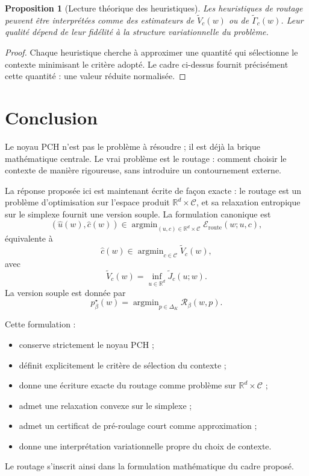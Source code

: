 \documentclass[11pt,a4paper]{article}
\newtheorem{proposition}{Proposition}[section]
\DeclareMathOperator{\argmin}{argmin}
\newcommand{\R}{\mathbb R}
\newcommand{\Ccal}{\mathcal C}
\newcommand{\Rcal}{\mathcal R}
\begin{document}
\begin{proposition}[Lecture théorique des heuristiques]
Les heuristiques de routage peuvent être interprétées comme des estimateurs de \(\widetilde V_c(w)\) ou de \(\widetilde \Gamma_c(w)\). Leur qualité dépend de leur fidélité à la structure variationnelle du problème.
\end{proposition}

\begin{proof}
Chaque heuristique cherche à approximer une quantité qui sélectionne le contexte minimisant le critère adopté. Le cadre ci-dessus fournit précisément cette quantité : une valeur réduite normalisée.
\end{proof}

\section{Conclusion}

Le noyau PCH n'est pas le problème à résoudre ; il est déjà la brique mathématique centrale. Le vrai problème est le routage : comment choisir le contexte de manière rigoureuse, sans introduire un contournement externe.

La réponse proposée ici est maintenant écrite de façon exacte : le routage est un problème d'optimisation sur l'espace produit \(\R^d\times\Ccal\), et sa relaxation entropique sur le simplexe fournit une version souple. La formulation canonique est
\[
(\hat u(w),\hat c(w))\in\argmin_{(u,c)\in\R^d\times\Ccal}\mathcal E_{\mathrm{route}}(w;u,c),
\]
équivalente à
\[
\hat c(w)\in\argmin_{c\in\Ccal}\widetilde V_c(w),
\]
avec
\[
\widetilde V_c(w)=\inf_{u\in\R^d}\widetilde J_c(u;w).
\]
La version souple est donnée par
\[
p^\star_\beta(w)
=
\argmin_{p\in\Delta_K}\Rcal_\beta(w,p).
\]

Cette formulation :
\begin{itemize}[leftmargin=2em]
\item conserve strictement le noyau PCH ;
\item définit explicitement le critère de sélection du contexte ;
\item donne une écriture exacte du routage comme problème sur \(\R^d\times\Ccal\) ;
\item admet une relaxation convexe sur le simplexe ;
\item admet un certificat de pré-roulage court comme approximation ;
\item donne une interprétation variationnelle propre du choix de contexte.
\end{itemize}

Le routage s'inscrit ainsi dans la formulation mathématique du cadre proposé.
\end{document}
